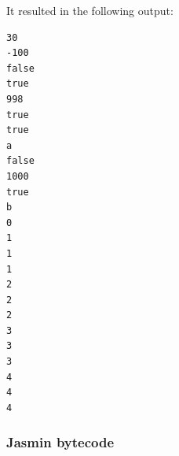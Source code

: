 \documentclass[paper=a4, fontsize=11pt]{article}
\numberwithin{equation}{section}		%
\numberwithin{figure}{section}			%
\numberwithin{table}{section}				%
\begin{document}
\noindent It resulted in the following output:
\begin{lstlisting}
30
-100
false
true
998
true
true
a
false
1000
true
b
0
1
1
1
2
2
2
3
3
3
4
4
4
\end{lstlisting}


\subsubsection{Jasmin bytecode}

\restoregeometry


% 
\end{document}
